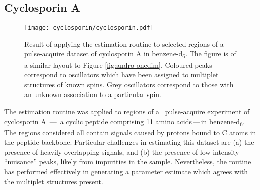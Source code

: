 \subsection{Cyclosporin A}
\begin{figure}
    \texttt{[image: cyclosporin/cyclosporin.pdf]}
    \caption[
        Result of applying the estimation routine to selected regions of a
        pulse-acquire dataset of cyclosporin A.
    ]{
        Result of applying the estimation routine to selected regions of a
        pulse-acquire dataset of cyclosporin A in benzene-d\textsubscript{6}.
        The figure is of a similar layout to Figure \ref{fig:andro-onedim}.
        Coloured peaks correspond to oscillators which have been assigned
        to multiplet structures of known spins. Grey oscillators correspond to
        those with an unknown association to a particular spin.
    }
    \label{fig:cyclosporin}
\end{figure}
The estimation routine was applied to regions of a \proton\ pulse-acquire
experiment of cyclosporin A \,---\, a cyclic
peptide comprising 11 amino acids\,---\,in benzene-d\textsubscript{6}. The
regions considered all contain signals caused by protons bound to
C\textsuperscript{\textalpha} atoms in the peptide backbone\cite{Verma2018}.
Particular challenges in estimating this dataset are (a) the presence of
heavily overlapping signals, and (b) the presence of low intensity ``nuisance''
peaks, likely from impurities in the sample. Nevertheless, the routine has performed
effectively in generating a parameter estimate which agrees with the multiplet
structures present.

